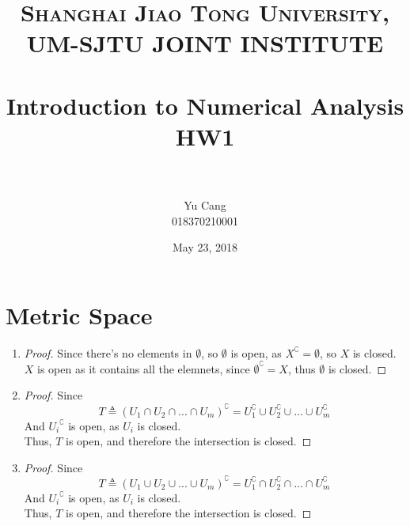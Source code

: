 \documentclass[paper=a4, fontsize=11pt]{scrartcl} %
\title{	
\normalfont \normalsize 
\textsc{Shanghai Jiao Tong University, UM-SJTU JOINT INSTITUTE} \\ [25pt] %
\horrule{0.5pt} \\[0.4cm] %
\huge Introduction to Numerical Analysis \\ HW1 \\ %
\horrule{2pt} \\[0.5cm] %
}
\author{Yu Cang \\ 018370210001} %
\date{\normalsize May 23, 2018} %
\numberwithin{equation}{section} %
\numberwithin{figure}{section} %
\numberwithin{table}{section} %
\begin{document}
\maketitle %


\section{Metric Space}
\begin{enumerate}
	\item
		\begin{proof}
			Since there's no elements in $\emptyset$, so $\emptyset$ is open, as $X^\complement = \emptyset$, so $X$ is closed.\\
			$X$ is open as it contains all the elemnets, since $\emptyset^\complement = X$, thus $\emptyset$ is closed. 
		\end{proof}
	\item
		\begin{proof}
			Since
			\begin{equation}
				T \triangleq (U_1 \cap U_2 \cap ... \cap U_m)^\complement = U_1^\complement \cup U_2^\complement \cup ... \cup U_m^\complement
			\end{equation}
			And ${U_i}^\complement$ is open, as $U_i$ is closed.\\
			Thus, $T$ is open, and therefore the intersection is closed. 
		\end{proof}
	\item 
		\begin{proof}
			Since
			\begin{equation}
				T \triangleq (U_1 \cup U_2 \cup ... \cup U_m)^\complement = U_1^\complement \cap U_2^\complement \cap ... \cap U_m^\complement
			\end{equation}
			And ${U_i}^\complement$ is open, as $U_i$ is closed.\\
			Thus, $T$ is open, and therefore the intersection is closed. 
		\end{proof}

\end{enumerate}


\end{document}
